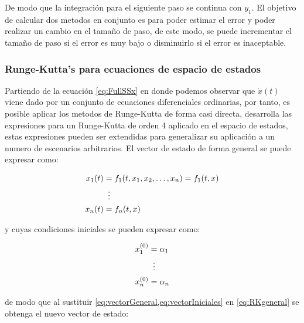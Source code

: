         De modo que la integración para el siguiente paso se continua con $y_1$. El objetivo de calcular dos metodos en conjunto es para poder estimar el error y poder realizar un cambio en el tamaño de paso, de este modo, se puede incrementar el tamaño de paso si el error es muy bajo o disminuirlo si el error es inaceptable.
        
        \subsubsection{Runge-Kutta's para ecuaciones de espacio de estados}

            Partiendo de la ecuación \cref{eq:FullSSx} en donde podemos observar que $\dot{x}(t)$ viene dado por un conjunto de ecuaciones diferenciales ordinarias, por tanto, es posible aplicar los metodos de Runge-Kutta de forma casi directa, \textcite{horacio1997metodos} desarrolla las expresiones para un Runge-Kutta de orden 4 aplicado en el espacio de estados, estas expresiones pueden ser extendidas para generalizar su aplicación a un numero de escenarios arbitrarios. El vector de estado de forma general se puede expresar como:

            
            \begin{equation}\label{eq:vectorGeneral}
                \begin{aligned}
                    x_1(t) &= f_1(t, x_1, x_2, \dots, x_n) = f_1(t,x)\\
                    &\mathrel{\makebox[\widthof{=}]{\vdots}}\\
                    x_n(t) &=  f_n(t,x)
                \end{aligned}
            \end{equation}

            \noindent y cuyas condiciones iniciales se pueden expresar como:

            \begin{equation}\label{eq:vectorIniciales}
                \begin{aligned}
                    x_1^{(0)} &= \alpha_1\\
                    &\mathrel{\makebox[\widthof{=}]{\vdots}}\\
                    x_n^{(0)} &=  \alpha_n
                \end{aligned}
            \end{equation}
            
            \noindent de modo que al sustituir \cref{eq:vectorGeneral,eq:vectorIniciales} en \cref{eq:RKgeneral} se obtenga el nuevo vector de estado:

